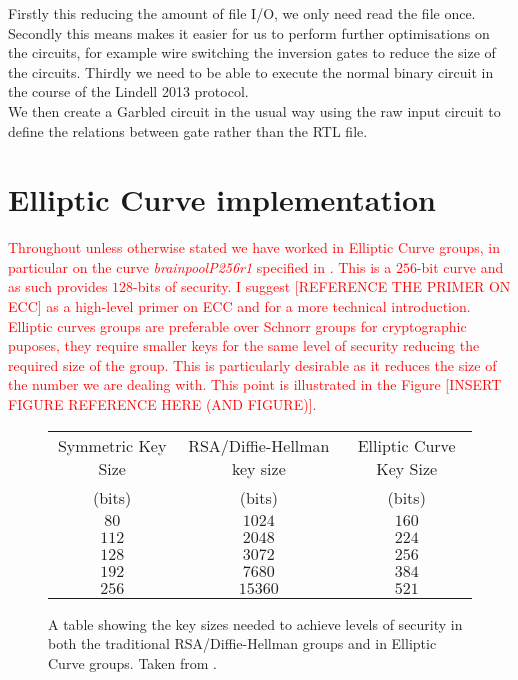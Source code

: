 \documentclass[ %
                    author={Nicholas Tutte},
                supervisor={Prof. Nigel Smart},
                    degree={MEng},
                     title={Secure Two Party Computation},
                  subtitle={A practical comparison of recent protocols},
                      type={Research - GG1K},
                      year={2015} ]{dissertation}
\begin{document}
				Firstly this reducing the amount of file I/O, we only need read the file once. Secondly this means makes it easier for us to perform further optimisations on the circuits, for example wire switching the inversion gates to reduce the size of the circuits. Thirdly we need to be able to execute the normal binary circuit in the course of the Lindell 2013 protocol.\\

				We then create a Garbled circuit in the usual way using the raw input circuit to define the relations between gate rather than the RTL file.

		\section{Elliptic Curve implementation}

			\textcolor{red}{Throughout unless otherwise stated we have worked in Elliptic Curve groups, in particular on the curve \emph{brainpoolP256r1} specified in \cite{BrainpoolSpecifications}. This is a $256$-bit curve and as such provides $128$-bits of security. I suggest [REFERENCE THE PRIMER ON ECC] as a high-level primer on ECC and \cite{ECC_RFC_6090} for a more technical introduction.}\\

			\textcolor{red}{Elliptic curves groups are preferable over Schnorr groups for cryptographic puposes, they require smaller keys for the same level of security reducing the required size of the group. This is particularly desirable as it reduces the size of the number we are dealing with. This point is illustrated in the Figure [INSERT FIGURE REFERENCE HERE (AND FIGURE)].}\\

			\begin{figure}[!htb]
				\begin{tabular}{| c | c | c |}
					\hline
					Symmetric Key Size & RSA/Diffie-Hellman key size & Elliptic Curve Key Size \\
					(bits) & (bits) & (bits) \\
					\hline
					\hline
					$80$ & $1024$ & $160$ \\
					\hline
					$112$ & $2048$ & $224$ \\
					\hline
					$128$ & $3072$ & $256$ \\
					\hline
					$192$ & $7680$ & $384$ \\
					\hline
					$256$ & $15360$ & $521$ \\
					\hline
				\end{tabular}

				\caption{A table showing the key sizes needed to achieve levels of security in both the traditional RSA/Diffie-Hellman groups and in Elliptic Curve groups. Taken from \cite{NSA_CaseForECC}. \label{fig:NSA_ECC_Table}}
			\end{figure}
\end{document}
